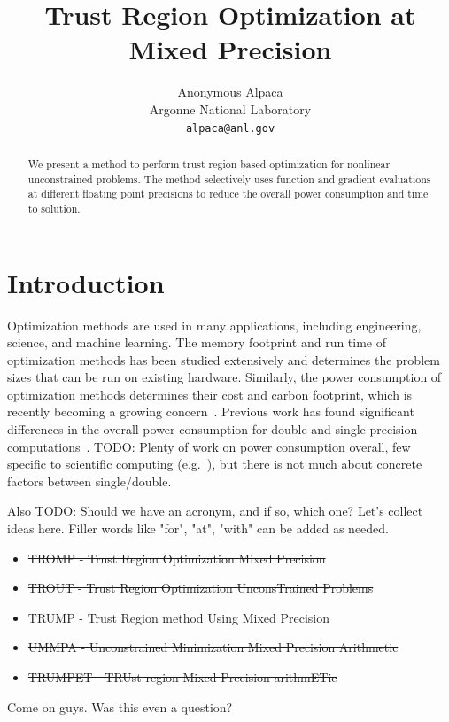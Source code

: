 \documentclass{article}
\title{Trust Region Optimization at Mixed Precision}
\author{
  Anonymous Alpaca \\
  Argonne National Laboratory \\
  \texttt{alpaca@anl.gov}
}
\newcommand{\mmnote}[1]{\textsf{{\color{red}{ MM:}   #1}}}
\begin{document}
\maketitle

\begin{abstract}
We present a method to perform trust region based optimization for nonlinear unconstrained problems. The method selectively uses function and gradient evaluations at different floating point precisions to reduce the overall power consumption and time to solution.
\end{abstract}



\section{Introduction}
\label{sec:intro}
Optimization methods are used in many applications, including engineering, science, and machine learning. The memory footprint and run time of optimization methods has been studied extensively and determines the problem sizes that can be run on existing hardware. Similarly, the power consumption of optimization methods determines their cost and carbon footprint, which is recently becoming a growing concern~\cite{hao2019training}. Previous work has found significant differences in the overall power consumption for double and single precision computations~\cite{molka2010characterizing}. TODO: Plenty of work on power consumption overall, few specific to scientific computing (e.g.~\cite{kestor2013quantifying}), but there is not much about concrete factors between single/double.

Also TODO: Should we have an acronym, and if so, which one? Let's collect ideas here. Filler words like "for", "at", "with" can be added as needed.
\begin{itemize}
    \item \sout{TROMP - Trust Region Optimization Mixed Precision}
    \item \sout{TROUT - Trust Region Optimization UnconsTrained Problems}
    \item TRUMP - Trust Region method Using Mixed Precision
    \item \sout{UMMPA - Unconstrained Minimization Mixed Precision Arithmetic}
    \item \sout{TRUMPET - TRUst region Mixed Precision arithmETic}
\end{itemize}
\mmnote{Come on guys. Was this even a question?} 
\end{document}

